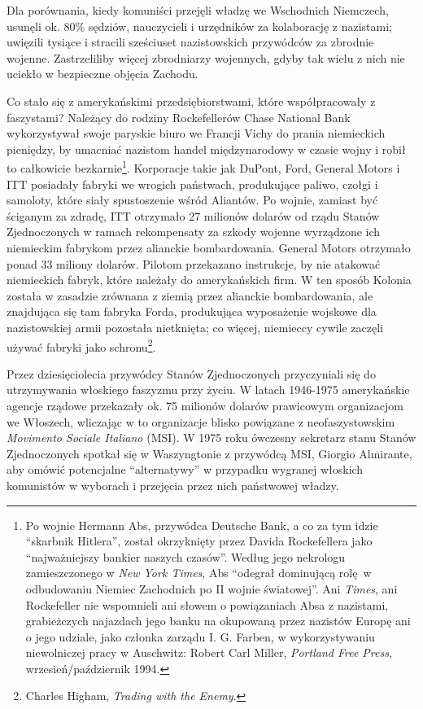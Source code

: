 \documentclass[12pt]{book}
\begin{document}
Dla porównania, kiedy komuniści przejęli władzę we Wschodnich Niemczech, usunęli ok. 80\% sędziów, nauczycieli i urzędników za kolaborację z nazistami; uwięzili tysiące i stracili sześciuset nazistowskich przywódców za zbrodnie wojenne. Zastrzeliliby więcej zbrodniarzy wojennych, gdyby tak wielu z nich nie uciekło w bezpieczne objęcia Zachodu.

Co stało się z amerykańskimi przedsiębiorstwami, które współpracowały z faszystami? Należący do rodziny Rockefellerów Chase National Bank wykorzystywał swoje paryskie biuro we Francji Vichy do prania niemieckich pieniędzy, by umacniać nazistom handel międzynarodowy w czasie wojny i robił to całkowicie bezkarnie\footnote{Po wojnie Hermann Abs, przywódca Deutsche Bank, a co za tym idzie ``skarbnik Hitlera'', został okrzyknięty przez Davida Rockefellera jako ``najważniejszy bankier naszych czasów''. Według jego nekrologu zamieszczonego w \textit{New York Times}, Abs ``odegrał dominującą rolę w odbudowaniu Niemiec Zachodnich po II wojnie światowej''. Ani \textit{Times}, ani Rockefeller nie wspomnieli ani słowem o powiązaniach Absa z nazistami, grabieżczych najazdach jego banku na okupowaną przez nazistów Europę ani o jego udziale, jako członka zarządu I. G. Farben, w wykorzystywaniu niewolniczej pracy w Auschwitz: Robert Carl Miller, \textit{Portland Free Press}, wrzesień/październik 1994.}. Korporacje takie jak DuPont, Ford, General Motors i ITT posiadały fabryki we wrogich państwach, produkujące paliwo, czołgi i samoloty, które siały spustoszenie wśród Aliantów. Po wojnie, zamiast być ściganym za zdradę, ITT otrzymało 27 milionów dolarów od rządu Stanów Zjednoczonych w ramach rekompensaty za szkody wojenne wyrządzone ich niemieckim fabrykom przez alianckie bombardowania. General Motors otrzymało ponad 33 miliony dolarów. Pilotom przekazano instrukcje, by nie atakować niemieckich fabryk, które należały do amerykańskich firm. W ten sposób Kolonia została w zasadzie zrównana z ziemią przez alianckie bombardowania, ale znajdująca się tam fabryka Forda, produkująca wyposażenie wojskowe dla nazistowskiej armii pozostała nietknięta; co więcej, niemieccy cywile zaczęli używać fabryki jako schronu\footnote{Charles Higham, \textit{Trading with the Enemy}.}.

Przez dziesięciolecia przywódcy Stanów Zjednoczonych przyczyniali się do utrzymywania włoskiego faszyzmu przy życiu. W latach 1946-1975 amerykańskie agencje rządowe przekazały ok. 75 milionów dolarów prawicowym organizacjom we Włoszech, wliczając w to organizacje blisko powiązane z neofaszystowskim \textit{Movimento Sociale Italiano} (MSI). W 1975 roku ówczesny sekretarz stanu Stanów Zjednoczonych spotkał się w Waszyngtonie z przywódcą MSI, Giorgio Almirante, aby omówić potencjalne ``alternatywy'' w przypadku wygranej włoskich komunistów w wyborach i przejęcia przez nich państwowej władzy.
\end{document}
